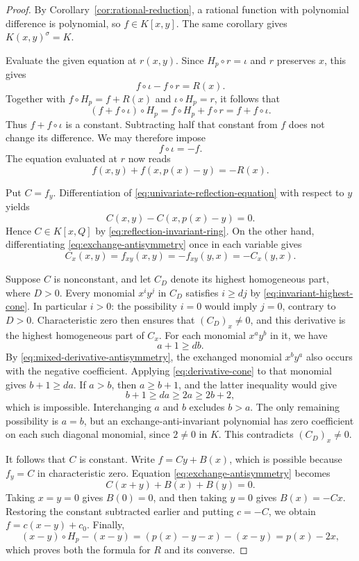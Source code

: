 \begin{proof}
By Corollary~\ref{cor:rational-reduction}, a rational function with
polynomial difference is polynomial, so $f\in K[x,y]$. The same corollary
gives $K(x,y)^{\sigma}=K$.

Evaluate the given equation at $r(x,y)$. Since $H_p\circ r=\iota$ and $r$
preserves $x$, this gives
\[
 f\circ\iota-f\circ r=R(x).
\]
Together with $f\circ H_p=f+R(x)$ and
$\iota\circ H_p=r$, it follows that
\[
 (f+f\circ\iota)\circ H_p
 =f\circ H_p+f\circ r
 =f+f\circ\iota.
\]
Thus $f+f\circ\iota$ is a constant. Subtracting half that constant from
$f$ does not change its difference. We may therefore impose
\begin{equation}
 f\circ\iota=-f.
 \label{eq:exchange-antisymmetry}
\end{equation}
The equation evaluated at $r$ now reads
\begin{equation}
 f(x,y)+f(x,p(x)-y)=-R(x).
 \label{eq:univariate-reflection-equation}
\end{equation}

Put $C=f_y$. Differentiation of
\eqref{eq:univariate-reflection-equation} with respect to $y$ yields
\[
 C(x,y)-C(x,p(x)-y)=0.
\]
Hence $C\in K[x,Q]$ by \eqref{eq:reflection-invariant-ring}. On the other
hand, differentiating \eqref{eq:exchange-antisymmetry} once in each variable
gives
\begin{equation}
 C_x(x,y)=f_{xy}(x,y)=-f_{xy}(y,x)=-C_x(y,x).
 \label{eq:mixed-derivative-antisymmetry}
\end{equation}

Suppose $C$ is nonconstant, and let $C_D$ denote its highest homogeneous
part, where $D>0$. Every monomial $x^iy^j$ in $C_D$ satisfies $i\ge dj$
by \eqref{eq:invariant-highest-cone}. In particular $i>0$: the possibility
$i=0$ would imply $j=0$, contrary to $D>0$. Characteristic zero then ensures
that $(C_D)_x\ne0$, and this derivative is the highest homogeneous part of
$C_x$. For each monomial $x^ay^b$ in it, we have
\begin{equation}
 a+1\ge db.
 \label{eq:derivative-cone}
\end{equation}
By \eqref{eq:mixed-derivative-antisymmetry}, the exchanged monomial
$x^by^a$ also occurs with the negative coefficient. Applying
\eqref{eq:derivative-cone} to that monomial gives $b+1\ge da$. If $a>b$,
then $a\ge b+1$, and the latter inequality would give
\[
 b+1\ge da\ge2a\ge2b+2,
\]
which is impossible. Interchanging $a$ and $b$ excludes $b>a$. The only
remaining possibility is $a=b$, but an exchange-anti-invariant polynomial
has zero coefficient on each such diagonal monomial, since $2\ne0$ in
$K$. This contradicts $(C_D)_x\ne0$.

It follows that $C$ is constant. Write $f=Cy+B(x)$, which is possible
because $f_y=C$ in characteristic zero. Equation
\eqref{eq:exchange-antisymmetry} becomes
\[
 C(x+y)+B(x)+B(y)=0.
\]
Taking $x=y=0$ gives $B(0)=0$, and then taking $y=0$ gives $B(x)=-Cx$.
Restoring the constant subtracted earlier and putting $c=-C$, we obtain
$f=c(x-y)+c_0$. Finally,
\[
 (x-y)\circ H_p-(x-y)
 =(p(x)-y-x)-(x-y)=p(x)-2x,
\]
which proves both the formula for $R$ and its converse.
\end{proof}

